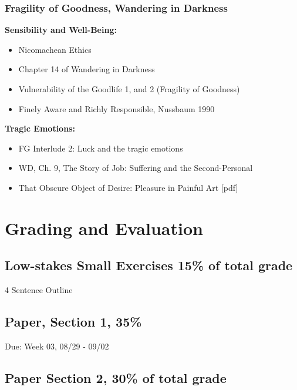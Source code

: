 \documentclass[11pt,]{article}
\providecommand{\tightlist}{%
  \setlength{\itemsep}{0pt}\setlength{\parskip}{0pt}}
\begin{document}
\subsubsection{Fragility of Goodness, Wandering in
Darkness}\label{fragility-of-goodness-wandering-in-darkness}

\textbf{Sensibility and Well-Being:}

\begin{itemize}
\tightlist
\item
  Nicomachean Ethics
\item
  Chapter 14 of Wandering in Darkness
\item
  Vulnerability of the Goodlife 1, and 2 (Fragility of Goodness)
\item
  Finely Aware and Richly Responsible, Nussbaum 1990
\end{itemize}

\textbf{Tragic Emotions:}

\begin{itemize}
\tightlist
\item
  FG Interlude 2: Luck and the tragic emotions
\item
  WD, Ch. 9, The Story of Job: Suffering and the Second-Personal
\item
  That Obscure Object of Desire: Pleasure in Painful Art {[}pdf{]}
\end{itemize}

\section{Grading and Evaluation}\label{grading-and-evaluation}

\subsection{Low-stakes Small Exercises 15\% of total
grade}\label{low-stakes-small-exercises-15-of-total-grade}

4 Sentence Outline

\subsection{Paper, Section 1, 35\%}\label{paper-section-1-35}

Due: Week 03, 08/29 - 09/02

\subsection{Paper Section 2, 30\% of total
grade}\label{paper-section-2-30-of-total-grade}
\end{document}
